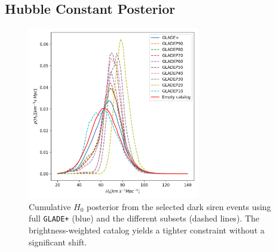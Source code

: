 \newpage

\subsection{Hubble Constant Posterior}

\begin{figure}[h!]
    \centering
    \includegraphics[width=0.67\textwidth]{figures/percentile_full_dict.png}
    \caption[Cumulative $H_0$ posterior from the selected dark siren events using full \texttt{GLADE+} and the different subsets.]{Cumulative $H_0$ posterior from the selected dark siren events using full \texttt{GLADE+} (blue) and the different subsets (dashed lines). The brightness-weighted catalog yields a tighter constraint without a significant shift.}
    \label{fig:h0_cumulative}
\end{figure}

